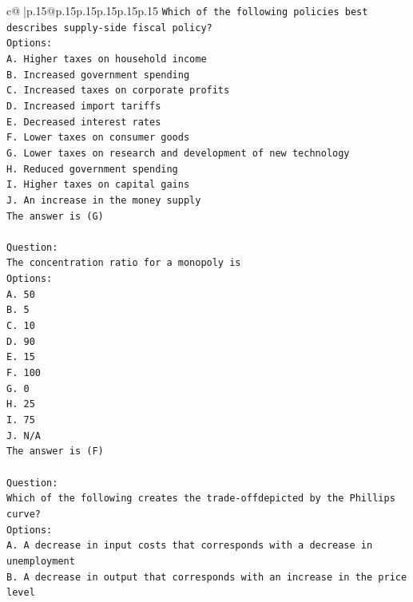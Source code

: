 \documentclass{article}
\begin{document}
{\begin{supertabular}{c@{$\;$}|p{.15\linewidth}@{}p{.15\linewidth}p{.15\linewidth}p{.15\linewidth}p{.15\linewidth}p{.15\linewidth}}
{{{\texttt{Which of the following policies best describes supply{-}side fiscal policy?} \\
\texttt{Options:} \\
\texttt{A. Higher taxes on household income} \\
\texttt{B. Increased government spending} \\
\texttt{C. Increased taxes on corporate profits} \\
\texttt{D. Increased import tariffs} \\
\texttt{E. Decreased interest rates} \\
\texttt{F. Lower taxes on consumer goods} \\
\texttt{G. Lower taxes on research and development of new technology} \\
\texttt{H. Reduced government spending} \\
\texttt{I. Higher taxes on capital gains} \\
\texttt{J. An increase in the money supply} \\
\texttt{The answer is (G)} \\
\\ 
\texttt{Question:} \\
\texttt{The concentration ratio for a monopoly is} \\
\texttt{Options:} \\
\texttt{A. 50} \\
\texttt{B. 5} \\
\texttt{C. 10} \\
\texttt{D. 90} \\
\texttt{E. 15} \\
\texttt{F. 100} \\
\texttt{G. 0} \\
\texttt{H. 25} \\
\texttt{I. 75} \\
\texttt{J. N/A} \\
\texttt{The answer is (F)} \\
\\ 
\texttt{Question:} \\
\texttt{Which of the following creates the trade{-}offdepicted by the Phillips curve?} \\
\texttt{Options:} \\
\texttt{A. A decrease in input costs that corresponds with a decrease in unemployment} \\
\texttt{B. A decrease in output that corresponds with an increase in the price level} \\
}}}
\end{supertabular}}
\end{document}
